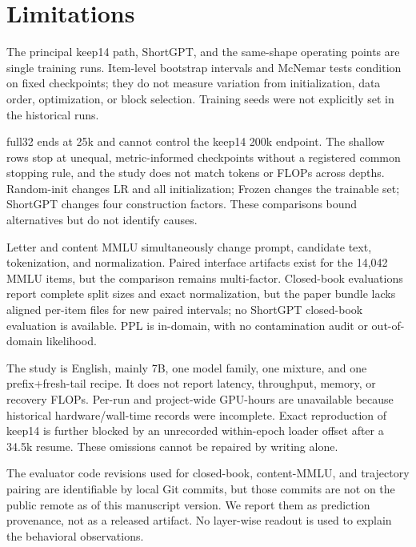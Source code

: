 \section*{Limitations}

The principal keep14 path, ShortGPT, and the same-shape operating points are
single training runs. Item-level bootstrap intervals and McNemar tests condition
on fixed checkpoints; they do not measure variation from initialization, data
order, optimization, or block selection. Training seeds were not explicitly
set in the historical runs.

full32 ends at 25k and cannot control the keep14 200k endpoint. The shallow
rows stop at unequal, metric-informed checkpoints without a registered common
stopping rule, and the study does not match tokens or FLOPs across depths.
Random-init changes LR and all initialization; Frozen changes the trainable
set; ShortGPT changes four construction factors. These comparisons bound
alternatives but do not identify causes.

Letter and content MMLU simultaneously change prompt, candidate text,
tokenization, and normalization. Paired interface artifacts exist for the
14,042 MMLU items, but the comparison remains multi-factor. Closed-book
evaluations report complete split sizes and exact normalization, but the paper
bundle lacks aligned per-item files for new paired intervals; no ShortGPT
closed-book evaluation is available. PPL is in-domain, with no contamination
audit or out-of-domain likelihood.

The study is English, mainly 7B, one model family, one mixture, and one
prefix+fresh-tail recipe. It does not report latency, throughput, memory, or
recovery FLOPs. Per-run and project-wide GPU-hours are unavailable because
historical hardware/wall-time records were incomplete. Exact reproduction of
keep14 is further blocked by an unrecorded within-epoch loader offset after a
34.5k resume. These omissions cannot be repaired by writing alone.

The evaluator code revisions used for closed-book, content-MMLU, and trajectory
pairing are identifiable by local Git commits, but those commits are not on the
public remote as of this manuscript version. We report them as prediction
provenance, not as a released artifact. No layer-wise readout is used to explain
the behavioral observations.
